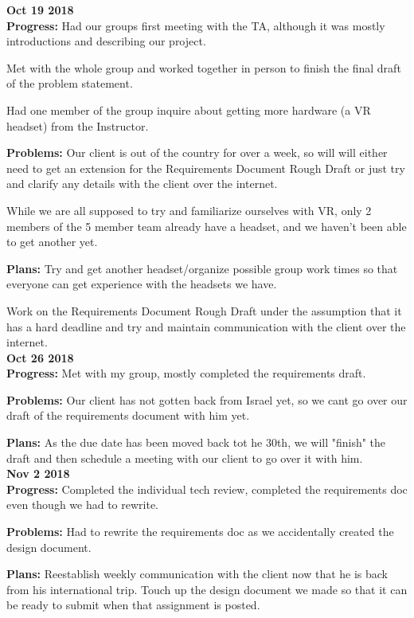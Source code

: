 \textbf{Oct 19 2018}\\
  \textbf{Progress:}
Had our groups first meeting with the TA, although it was mostly introductions and describing our project.

Met with the whole group and worked together in person to finish the final draft of the problem statement. 

Had one member of the group inquire about getting more hardware (a VR headset) from the Instructor. 

  \textbf{Problems:}
Our client is out of the country for over a week, so will will either need to get an extension for the Requirements Document Rough Draft or just try and clarify any details with the client over the internet.  

While we are all supposed to try and familiarize ourselves with VR, only 2 members of the 5 member team already have a headset, and we haven't been able to get another yet. 

  \textbf{Plans:} 
Try and get another headset/organize possible group work times so that everyone can get experience with the headsets we have.

Work on the Requirements Document Rough Draft under the assumption that it has a hard deadline and try and maintain communication with the client over the internet. \\

\textbf{Oct 26 2018}\\
\textbf{Progress:}
Met with my group, mostly completed the requirements draft. 

\textbf{Problems:}
Our client has not gotten back from Israel yet, so we cant go over our draft of the requirements document with him yet.

\textbf{Plans:}
As the due date has been moved back tot he 30th, we will "finish" the draft and then schedule a meeting with our client to go over it with him. \\


\textbf{Nov 2 2018}\\
\textbf{Progress:}
Completed the individual tech review, completed the requirements doc even though we had to rewrite.


\textbf{Problems:}
Had to rewrite the requirements doc as we accidentally created the design document.


\textbf{Plans:}
Reestablish weekly communication with the client now that he is back from his international trip. Touch up the design document we made so that it can be ready to submit when that assignment is posted.\\


